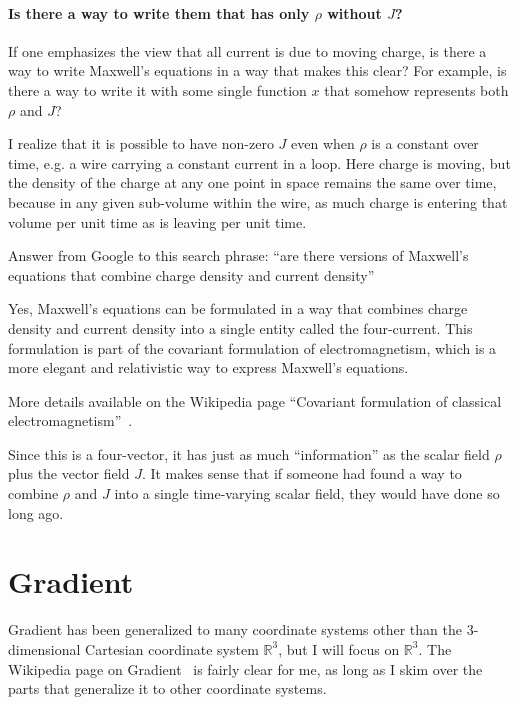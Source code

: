 \documentclass[a4paper]{article}
\theoremstyle{plain}
\theoremstyle{definition}
\newcommand{\reals}{\mathbb{R}}
\begin{document}
\paragraph{Is there a way to write them that has only $\rho$ without $J$?}

If one emphasizes the view that all current is due to moving charge,
is there a way to write Maxwell's equations in a way that makes this
clear?  For example, is there a way to write it with some single
function $x$ that somehow represents both $\rho$ and $J$?

I realize that it is possible to have non-zero $J$ even when $\rho$ is
a constant over time, e.g. a wire carrying a constant current in a
loop.  Here charge is moving, but the density of the charge at any one
point in space remains the same over time, because in any given
sub-volume within the wire, as much charge is entering that volume per
unit time as is leaving per unit time.

Answer from Google to this search phrase: ``are there versions of
Maxwell's equations that combine charge density and current density''

Yes, Maxwell's equations can be formulated in a way that combines
charge density and current density into a single entity called the
four-current.  This formulation is part of the covariant formulation
of electromagnetism, which is a more elegant and relativistic way to
express Maxwell's equations.

More details available on the Wikipedia page ``Covariant formulation
of classical
electromagnetism''~\cite{CovariantFormulationOfClassicalElectromagnetism}.

Since this is a four-vector, it has just as much ``information'' as
the scalar field $\rho$ plus the vector field $J$.  It makes sense
that if someone had found a way to combine $\rho$ and $J$ into a
single time-varying scalar field, they would have done so long ago.


\section{Gradient}
\label{sec:gradient}

Gradient has been generalized to many coordinate systems other than
the 3-dimensional Cartesian coordinate system $\reals^3$, but I will
focus on $\reals^3$.  The Wikipedia page on Gradient~\cite{Gradient}
is fairly clear for me, as long as I skim over the parts that
generalize it to other coordinate systems.
\end{document}
